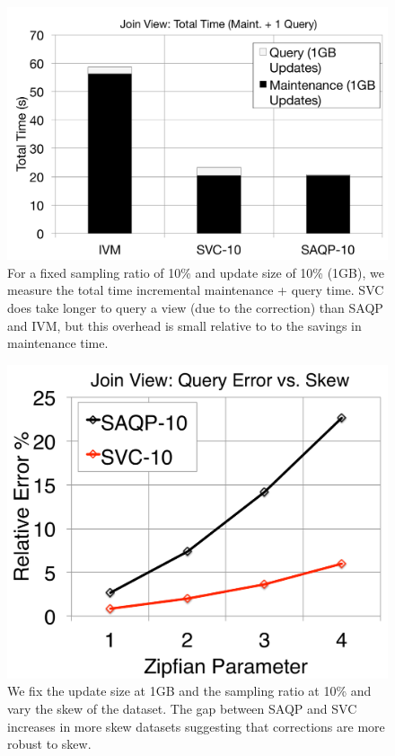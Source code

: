 \begin{figure}[t]
\centering
 \includegraphics[scale=0.20]{exp/msj_4.pdf}
  \caption{For a fixed sampling ratio of 10\% and update size of 10\% (1GB), we measure the total time incremental maintenance + query time. SVC does take longer to query a view (due to the correction) than SAQP and IVM, but this overhead is small relative to to the savings in maintenance time. }
\end{figure}

\begin{figure}[t]
\centering
  \includegraphics[scale=0.25]{exp/msj_5.pdf}
 \caption{We fix the update size at 1GB and the sampling ratio at 10\% and vary the skew of the dataset. The gap between SAQP and SVC increases in more skew datasets suggesting that corrections are more robust to skew. \label{exp-1-zipf}}
\end{figure}

